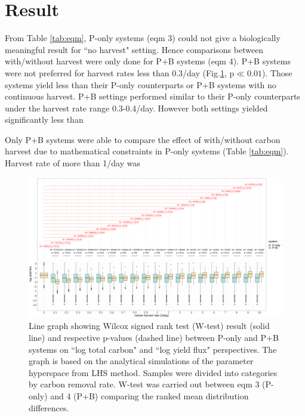 \documentclass[../thesis.tex]{subfiles} %
\begin{document}
\section{Result}
From Table \ref{tab:eqm}, P-only systems (eqm 3) could not give a biologically meaningful result for ``no harvest" setting.  Hence comparisons between with/without harvest were only done for P+B systems (eqm 4).  P+B systems were not preferred for harvest rates less than 0.3/day (Fig.\ref{fig:wilcox}, p$\ll 0.01$).  Those systems yield less than their P-only counterparts or P+B systems with no continuous harvest.  P+B settings performed similar to their P-only counterparts under the harvest rate range 0.3-0.4/day.  However both settings yielded significantly less than

Only P+B systems were able to compare the effect of with/without carbon harvest due to mathematical constraints in P-only systems (Table \ref{tab:eqm}).  Harvest rate of more than 1/day was 

\begin{figure}[H]
    \centering
    \includegraphics[width=\linewidth]{../result/Wilcox.png}
    \caption[Wilcox test summary]{Line graph showing Wilcox signed rank test (W-test) result (solid line) and respective p-values (dashed line) between P-only and P+B systems on ``log total carbon" and ``log yield flux" perspectives.  {\scriptsize The graph is based on the analytical simulations of the parameter hyperspace from LHS method.  Samples were divided into categories by carbon removal rate.  W-test was carried out between eqm 3 (P-only) and 4 (P+B) comparing the ranked mean distribution differences.}}
    \label{fig:wilcox}
\end{figure}
\end{document}
